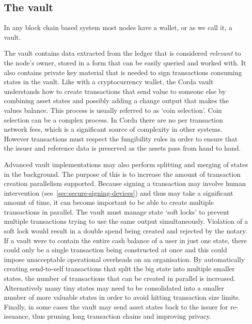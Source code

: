 \documentclass{article}
\begin{document}
\subsection{The vault}\label{sec:vault}

In any block chain based system most nodes have a wallet, or as we call it, a vault.

The vault contains data extracted from the ledger that is considered \emph{relevant} to the node's owner, stored in
a form that can be easily queried and worked with. It also contains private key material that is needed to sign
transactions consuming states in the vault. Like with a cryptocurrency wallet, the Corda vault understands how to
create transactions that send value to someone else by combining asset states and possibly adding a change output
that makes the values balance. This process is usually referred to as `coin selection'. Coin selection can be a
complex process. In Corda there are no per transaction network fees, which is a significant source of complexity in
other systems. However transactions must respect the fungibility rules in order to ensure that the issuer and
reference data is preserved as the assets pass from hand to hand.

Advanced vault implementations may also perform splitting and merging of states in the background. The purpose of
this is to increase the amount of transaction creation parallelism supported. Because signing a transaction may
involve human intervention (see~\cref{sec:secure-signing-devices}) and thus may take a significant amount of time,
it can become important to be able to create multiple transactions in parallel. The vault must manage state `soft
locks' to prevent multiple transactions trying to use the same output simultaneously. Violation of a soft lock
would result in a double spend being created and rejected by the notary. If a vault were to contain the entire cash
balance of a user in just one state, there could only be a single transaction being constructed at once and this
could impose unacceptable operational overheads on an organisation. By automatically creating send-to-self
transactions that split the big state into multiple smaller states, the number of transactions that can be created
in parallel is increased. Alternatively many tiny states may need to be consolidated into a smaller number of more
valuable states in order to avoid hitting transaction size limits. Finally, in some cases the vault may send asset
states back to the issuer for re-issuance, thus pruning long transaction chains and improving privacy.
\end{document}
